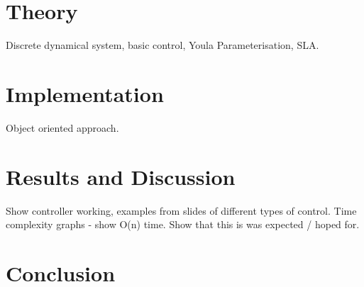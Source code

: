 \documentclass[11pt,a4paper]{article}
\begin{document}
\section{Theory}
Discrete dynamical system, basic control, Youla Parameterisation, SLA.


\section{Implementation}
Object oriented approach. 

\section{Results and Discussion}
Show controller working, examples from slides of different types of control. Time complexity graphs - show O(n) time. Show that this is was expected / hoped for.
\section{Conclusion}


\cite{Amin2005}



\end{document}
